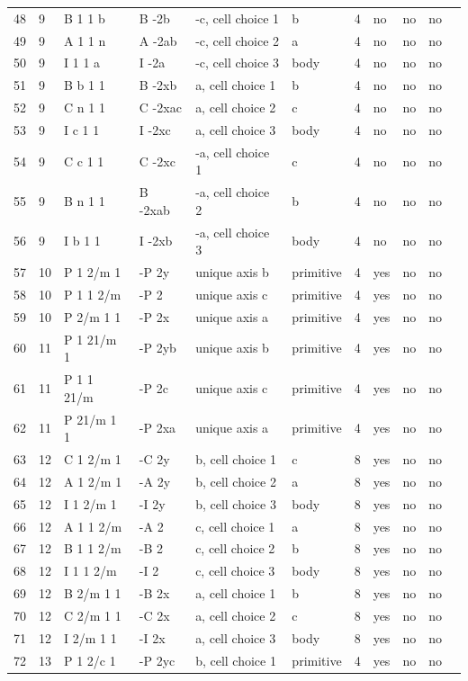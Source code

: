 \begin{center}
\begin{small}
\begin{longtable}{|l|l|l|l|l|l|l|l|l|l|l|}
48 &9 &B 1 1 b &B -2b &-c, cell choice 1 &b &4 &no &no &no \\ 
49 &9 &A 1 1 n &A -2ab &-c, cell choice 2 &a &4 &no &no &no \\ 
50 &9 &I 1 1 a &I -2a &-c, cell choice 3 &body &4 &no &no &no \\ 
51 &9 &B b 1 1 &B -2xb &a, cell choice 1 &b &4 &no &no &no \\ 
52 &9 &C n 1 1 &C -2xac &a, cell choice 2 &c &4 &no &no &no \\ 
53 &9 &I c 1 1 &I -2xc &a, cell choice 3 &body &4 &no &no &no \\ 
54 &9 &C c 1 1 &C -2xc &-a, cell choice 1 &c &4 &no &no &no \\ 
55 &9 &B n 1 1 &B -2xab &-a, cell choice 2 &b &4 &no &no &no \\ 
56 &9 &I b 1 1 &I -2xb &-a, cell choice 3 &body &4 &no &no &no \\ 
57 &10 &P 1 2/m 1 &-P 2y &unique axis b &primitive &4 &yes &no &no \\ 
58 &10 &P 1 1 2/m &-P 2 &unique axis c &primitive &4 &yes &no &no \\ 
59 &10 &P 2/m 1 1 &-P 2x &unique axis a &primitive &4 &yes &no &no \\ 
60 &11 &P 1 21/m 1 &-P 2yb &unique axis b &primitive &4 &yes &no &no \\ 
61 &11 &P 1 1 21/m &-P 2c &unique axis c &primitive &4 &yes &no &no \\ 
62 &11 &P 21/m 1 1 &-P 2xa &unique axis a &primitive &4 &yes &no &no \\ 
63 &12 &C 1 2/m 1 &-C 2y &b, cell choice 1 &c &8 &yes &no &no \\ 
64 &12 &A 1 2/m 1 &-A 2y &b, cell choice 2 &a &8 &yes &no &no \\ 
65 &12 &I 1 2/m 1 &-I 2y &b, cell choice 3 &body &8 &yes &no &no \\ 
66 &12 &A 1 1 2/m &-A 2 &c, cell choice 1 &a &8 &yes &no &no \\ 
67 &12 &B 1 1 2/m &-B 2 &c, cell choice 2 &b &8 &yes &no &no \\ 
68 &12 &I 1 1 2/m &-I 2 &c, cell choice 3 &body &8 &yes &no &no \\ 
69 &12 &B 2/m 1 1 &-B 2x &a, cell choice 1 &b &8 &yes &no &no \\ 
70 &12 &C 2/m 1 1 &-C 2x &a, cell choice 2 &c &8 &yes &no &no \\ 
71 &12 &I 2/m 1 1 &-I 2x &a, cell choice 3 &body &8 &yes &no &no \\ 
72 &13 &P 1 2/c 1 &-P 2yc &b, cell choice 1 &primitive &4 &yes &no &no \\ 

\end{longtable}
\end{small}
\end{center}
